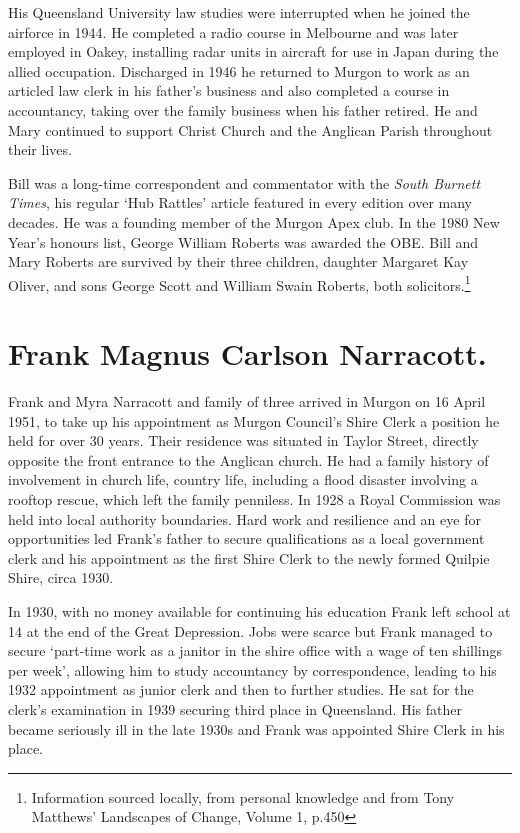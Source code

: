 His Queensland University law studies were interrupted when he joined the airforce in 1944. He completed a radio course in Melbourne and was later employed in Oakey, installing radar units in aircraft for use in Japan during the allied occupation. Discharged in 1946 he returned to Murgon to work as an articled law clerk in his father's business and also completed a course in accountancy, taking over the family business when his father retired. He and Mary continued to support Christ Church and the Anglican Parish throughout their lives.



Bill was a long-time correspondent and commentator with the \emph{South Burnett Times}, his regular `Hub Rattles' article featured in every edition over many decades. He was a founding member of the Murgon Apex club. In the 1980 New Year's honours list, George William Roberts was awarded the OBE. Bill and Mary Roberts are survived by their three children, daughter Margaret Kay Oliver, and sons George Scott and William Swain Roberts, both solicitors.\footnote{Information sourced locally, from personal knowledge and from Tony Matthews' Landscapes of Change, Volume 1, p.450}


\section{Frank Magnus Carlson Narracott.}



Frank and Myra Narracott and family of three arrived in Murgon on 16 April 1951, to take up his appointment as Murgon Council's Shire Clerk a position he held for over 30 years. Their residence was situated in Taylor Street, directly opposite the front entrance to the Anglican church. He had a family history of involvement in church life, country life, including a flood disaster involving a rooftop rescue, which left the family penniless. In 1928 a Royal Commission was held into local authority boundaries. Hard work and resilience and an eye for opportunities led Frank's father to secure qualifications as a local government clerk and his appointment as the first Shire Clerk to the newly formed Quilpie Shire, circa 1930.



In 1930, with no money available for continuing his education Frank left school at 14 at the end of the Great Depression. Jobs were scarce but Frank managed to secure `part-time work as a janitor in the shire office with a wage of ten shillings per week', allowing him to study accountancy by correspondence, leading to his 1932 appointment as junior clerk and then to further studies. He sat for the clerk's examination in 1939 securing third place in Queensland. His father became seriously ill in the late 1930s and Frank was appointed Shire Clerk in his place.



